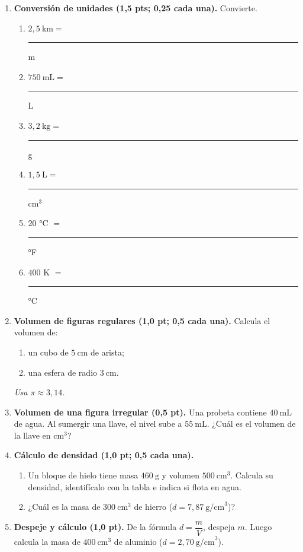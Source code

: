 \documentclass[12pt, letterpaper]{article}
\begin{document}
\begin{enumerate}[leftmargin=*, label=\textbf{\arabic*.}, itemsep=0.6em]

  \item \textbf{Conversión de unidades (1,5 pts; 0,25 cada una).} Convierte.
        \begin{enumerate}[label=\alph*), leftmargin=1.8em, itemsep=0.35em]
          \item $2{,}5\ \text{km} =$ \rule{1.8cm}{0.4pt} m
          \item $750\ \text{mL} =$ \rule{1.8cm}{0.4pt} L
          \item $3{,}2\ \text{kg} =$ \rule{1.8cm}{0.4pt} g
          \item $1{,}5\ \text{L} =$ \rule{1.8cm}{0.4pt} $\text{cm}^3$
          \item $20$ °C $=$ \rule{1.8cm}{0.4pt} °F
          \item $400$ K $=$ \rule{1.8cm}{0.4pt} °C
        \end{enumerate}

  \item \textbf{Volumen de figuras regulares (1,0 pt; 0,5 cada una).} Calcula el volumen de:
        \begin{enumerate}[label=\alph*), leftmargin=1.8em, itemsep=0.3em]
          \item un cubo de $5\ \text{cm}$ de arista;
          \item una esfera de radio $3\ \text{cm}$.
        \end{enumerate}
        \textit{Usa $\pi \approx 3{,}14$.}
        \vspace{1.2cm}

  \item \textbf{Volumen de una figura irregular (0,5 pt).} Una probeta contiene
        $40\ \text{mL}$ de agua. Al sumergir una llave, el nivel sube a $55\ \text{mL}$.
        ¿Cuál es el volumen de la llave en $\text{cm}^3$?
        \vspace{1.0cm}

  \item \textbf{Cálculo de densidad (1,0 pt; 0,5 cada una).}
        \begin{enumerate}[label=\alph*), leftmargin=1.8em, itemsep=0.45em]
          \item Un bloque de hielo tiene masa $460\ \text{g}$ y volumen $500\ \text{cm}^3$.
                Calcula su densidad, identifícalo con la tabla e indica si flota en agua.
          \item ¿Cuál es la masa de $300\ \text{cm}^3$ de hierro ($d=7{,}87\ \text{g/cm}^3$)?
        \end{enumerate}
        \vspace{1.3cm}

  \item \textbf{Despeje y cálculo (1,0 pt).} De la fórmula $d=\dfrac{m}{V}$, despeja $m$.
        Luego calcula la masa de $400\ \text{cm}^3$ de aluminio
        ($d=2{,}70\ \text{g/cm}^3$).
        \vspace{1.2cm}
\end{enumerate}
\end{document}
